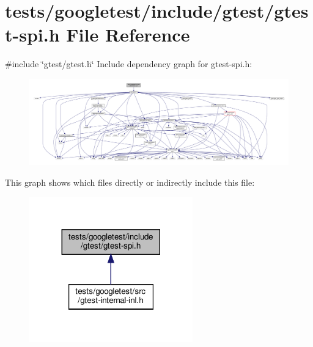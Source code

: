 \hypertarget{gtest-spi_8h}{}\section{tests/googletest/include/gtest/gtest-\/spi.h File Reference}
\label{gtest-spi_8h}
{\ttfamily \#include \char`\"{}gtest/gtest.\+h\char`\"{}}\newline
Include dependency graph for gtest-\/spi.h\+:\nopagebreak
\begin{figure}[H]
\begin{center}
\leavevmode
\includegraphics[width=350pt]{gtest-spi_8h__incl}
\end{center}
\end{figure}
This graph shows which files directly or indirectly include this file\+:\nopagebreak
\begin{figure}[H]
\begin{center}
\leavevmode
\includegraphics[width=200pt]{gtest-spi_8h__dep__incl}
\end{center}
\end{figure}
